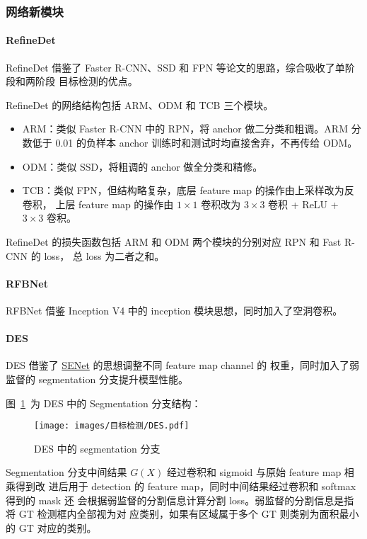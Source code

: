 \subsubsection{网络新模块}
\paragraph{RefineDet}
RefineDet 借鉴了 Faster R-CNN、SSD 和 FPN 等论文的思路，综合吸收了单阶段和两阶段
目标检测的优点。

RefineDet 的网络结构包括 ARM、ODM 和 TCB 三个模块。
\begin{itemize}
  \item ARM：类似 Faster R-CNN 中的 RPN，将 anchor 做二分类和粗调。ARM 分数低于
    0.01 的负样本 anchor 训练时和测试时均直接舍弃，不再传给 ODM。
  \item ODM：类似 SSD，将粗调的 anchor 做全分类和精修。
  \item TCB：类似 FPN，但结构略复杂，底层 feature map 的操作由上采样改为反卷积，
    上层 feature map 的操作由 $1 \times 1$ 卷积改为 $3 \times 3$ 卷积 + ReLU +
    $3 \times 3$ 卷积。
\end{itemize}

RefineDet 的损失函数包括 ARM 和 ODM 两个模块的分别对应 RPN 和 Fast R-CNN 的 loss，
总 loss 为二者之和。

\paragraph{RFBNet}
RFBNet 借鉴 Inception V4 中的 inception 模块思想，同时加入了空洞卷积。

\paragraph{DES}
DES 借鉴了 \hyperref[subsec:SENet]{SENet} 的思想调整不同 feature map channel 的
权重，同时加入了弱监督的 segmentation 分支提升模型性能。

图~\ref{fig:des-seg}~为 DES 中的 Segmentation 分支结构：

\begin{figure}[ht]
  \centering
  \texttt{[image: images/目标检测/DES.pdf]}
  \caption{DES 中的 segmentation 分支}\label{fig:des-seg}
\end{figure}

Segmentation 分支中间结果 $G(X)$ 经过卷积和 sigmoid 与原始 feature map 相乘得到改
进后用于 detection 的 feature map，同时中间结果经过卷积和 softmax 得到的 mask 还
会根据弱监督的分割信息计算分割 loss。弱监督的分割信息是指将 GT 检测框内全部视为对
应类别，如果有区域属于多个 GT 则类别为面积最小的 GT 对应的类别。

